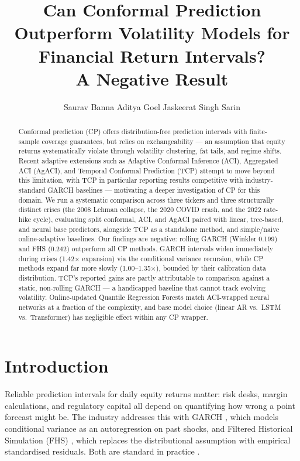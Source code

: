 \documentclass{article}
\title{Can Conformal Prediction Outperform Volatility Models for Financial Return Intervals? \\ A Negative Result}
\author{%
  Saurav Banna
  \And
  Aditya Goel
  \And
  Jaskeerat Singh Sarin
}
\begin{document}
\maketitle



\begin{abstract}
Conformal prediction (CP) offers distribution-free prediction intervals with finite-sample coverage guarantees, but relies on exchangeability --- an assumption that equity returns systematically violate through volatility clustering, fat tails, and regime shifts. Recent adaptive extensions such as Adaptive Conformal Inference (ACI), Aggregated ACI (AgACI), and Temporal Conformal Prediction (TCP) \citep{aich2026} attempt to move beyond this limitation, with TCP in particular reporting results competitive with industry-standard GARCH baselines --- motivating a deeper investigation of CP for this domain. We run a systematic comparison across three tickers and three structurally distinct crises (the 2008 Lehman collapse, the 2020 COVID crash, and the 2022 rate-hike cycle), evaluating split conformal, ACI, and AgACI paired with linear, tree-based, and neural base predictors, alongside TCP as a standalone method, and simple/naive online-adaptive baselines. Our findings are negative: rolling GARCH (Winkler 0.199) and FHS (0.242) outperform all CP methods. GARCH intervals widen immediately during crises (1.42$\times$ expansion) via the conditional variance recursion, while CP methods expand far more slowly (1.00--1.35$\times$), bounded by their calibration data distribution. TCP's reported gains are partly attributable to comparison against a static, non-rolling GARCH --- a handicapped baseline that cannot track evolving volatility. Online-updated Quantile Regression Forests match ACI-wrapped neural networks at a fraction of the complexity, and base model choice (linear AR vs.\ LSTM vs.\ Transformer) has negligible effect within any CP wrapper.
\end{abstract}

\section{Introduction}

Reliable prediction intervals for daily equity returns matter: risk desks, margin calculations, and regulatory capital all depend on quantifying how wrong a point forecast might be. The industry addresses this with GARCH \citep{engle1982,bollerslev1986}, which models conditional variance as an autoregression on past shocks, and Filtered Historical Simulation (FHS) \citep{barone2001}, which replaces the distributional assumption with empirical standardised residuals. Both are standard in practice \citep{mcneil2015}.
\end{document}
